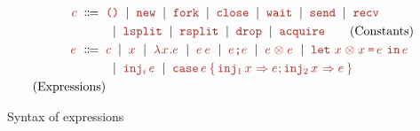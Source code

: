 \documentclass{article}
\begin{document}

\begin{figure}
  \begin{align*}
    \C \grmeq
      & \CUnit
        \grmor \CNew
        \grmor \CFork
        \grmor \CTerm 
        \grmor \CWait
        \grmor \CSend
        \grmor \CRecv
    \\&
    \grmor \CSplit \grmor \CSSplit
    \grmor \CDrop \grmor \CAcq
        \tag{Constants} \\
    \E \grmeq
      & \C \grmor \EVar \grmor \EAbs\EVar\E \grmor \EApp\E\E 
        \grmor \ESeq\E\E
        \grmor \EPair\E\E
        \grmor \ELetPair{\EVar}{\EVar}{\E}{\E} \\
      &  \grmor \EInj i \E 
        \grmor\ECase\E{\EVar}{\E}{\EVar}{\E} \\
        \tag{Expressions}
  \end{align*}
  \caption{Syntax of expressions}
  \label{fig:syntax-expressions}
\end{figure}

\end{document}
